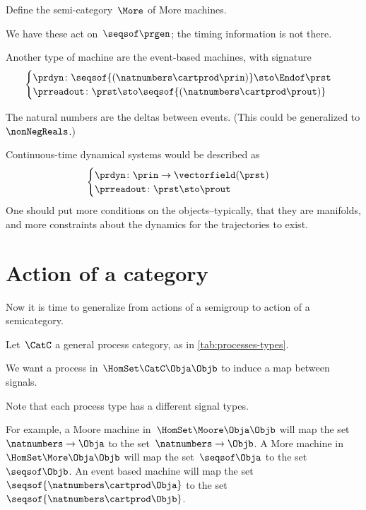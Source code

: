 \begin{exercise}
    Define the semi-category~$\More$ of More machines.
\end{exercise}
\begin{solution}
\end{solution}

We have these act on~$\seqsof \prgen$; the timing information is not there.

Another type of machine are the event-based machines, with signature
\begin{equation}
    \label{eq:event-based}
    \begin{cases}
        \prdyn \colon \seqsof{(\natnumbers \cartprod \prin)} \sto \Endof \prst \\
        \prreadout \colon \prst \sto \seqsof{ (\natnumbers \cartprod \prout)}
    \end{cases}
\end{equation}

The natural numbers are the deltas between events. (This could be generalized to $\nonNegReals$.)

Continuous-time dynamical systems would be described as
%
\begin{equation}
    \label{eq:continuous}
    \begin{cases}
        \prdyn\colon \prin \to \vectorfield(\prst) \\
        \prreadout\colon \prst \sto   \prout
    \end{cases}
\end{equation}
%
One should put more conditions on the objects--typically, that they are manifolds, and more constraints about the dynamics for the trajectories to exist.


\section{Action of a category}

Now it is time to generalize from actions of a semigroup to action of a semicategory.

Let~$\CatC$ a general process category, as in \cref{tab:processes-types}.

We want a process in~$\HomSet\CatC\Obja\Objb$ to induce a map between signals.

Note that each process type has a different signal types.

For example, a Moore machine in~$\HomSet\Moore\Obja\Objb$ will map the set~$\natnumbers \to \Obja$ to the set~$\natnumbers \to \Objb$.
A More machine in~$\HomSet\More\Obja\Objb$  will map the set~$\seqsof \Obja$ to the set~$\seqsof \Objb$.
An event based machine will map the set~$\seqsof{\natnumbers \cartprod \Obja}$ to the set~$\seqsof{\natnumbers \cartprod \Objb}$.

